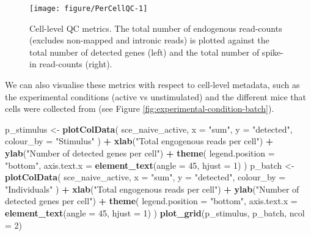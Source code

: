 \documentclass[9pt,a4paper,]{extarticle}
\newenvironment{Shaded}{\begin{snugshade}}{\end{snugshade}}
\newcommand{\DataTypeTok}[1]{\textcolor[rgb]{0.13,0.29,0.53}{#1}}
\newcommand{\DecValTok}[1]{\textcolor[rgb]{0.00,0.00,0.81}{#1}}
\newcommand{\KeywordTok}[1]{\textcolor[rgb]{0.13,0.29,0.53}{\textbf{#1}}}
\newcommand{\NormalTok}[1]{#1}
\newcommand{\OperatorTok}[1]{\textcolor[rgb]{0.81,0.36,0.00}{\textbf{#1}}}
\newcommand{\StringTok}[1]{\textcolor[rgb]{0.31,0.60,0.02}{#1}}
\begin{document}
\begin{figure}

{\centering \texttt{[image: figure/PerCellQC-1]} 

}

\caption{Cell-level QC metrics. The total number of endogenous read-counts (excludes non-mapped and intronic reads) is plotted against the total number of detected genes (left) and the total number of spike-in read-counts (right).}\label{fig:PerCellQC}
\end{figure}

We can also visualise these metrics with respect to cell-level metadata, such
as the experimental conditions (active vs unstimulated) and the different mice
that cells were collected from
(see Figure \ref{fig:experimental-condition-batch}).

\begin{Shaded}
\begin{Highlighting}[]
\NormalTok{p_stimulus <-}\StringTok{ }\KeywordTok{plotColData}\NormalTok{(}
\NormalTok{    sce_naive_active,}
    \DataTypeTok{x =} \StringTok{"sum"}\NormalTok{,}
    \DataTypeTok{y =} \StringTok{"detected"}\NormalTok{, }
    \DataTypeTok{colour_by =} \StringTok{"Stimulus"}
\NormalTok{  ) }\OperatorTok{+}
\StringTok{  }\KeywordTok{xlab}\NormalTok{(}\StringTok{"Total engogenous reads per cell"}\NormalTok{) }\OperatorTok{+}
\StringTok{  }\KeywordTok{ylab}\NormalTok{(}\StringTok{"Number of detected genes per cell"}\NormalTok{) }\OperatorTok{+}
\StringTok{  }\KeywordTok{theme}\NormalTok{(}
    \DataTypeTok{legend.position =} \StringTok{"bottom"}\NormalTok{,}
    \DataTypeTok{axis.text.x =} \KeywordTok{element_text}\NormalTok{(}\DataTypeTok{angle =} \DecValTok{45}\NormalTok{, }\DataTypeTok{hjust =} \DecValTok{1}\NormalTok{)}
\NormalTok{  )}
\NormalTok{p_batch <-}\StringTok{ }\KeywordTok{plotColData}\NormalTok{(}
\NormalTok{    sce_naive_active,}
    \DataTypeTok{x =} \StringTok{"sum"}\NormalTok{,}
    \DataTypeTok{y =} \StringTok{"detected"}\NormalTok{, }
    \DataTypeTok{colour_by =} \StringTok{"Individuals"}
\NormalTok{  ) }\OperatorTok{+}
\StringTok{  }\KeywordTok{xlab}\NormalTok{(}\StringTok{"Total engogenous reads per cell"}\NormalTok{) }\OperatorTok{+}
\StringTok{  }\KeywordTok{ylab}\NormalTok{(}\StringTok{"Number of detected genes per cell"}\NormalTok{) }\OperatorTok{+}
\StringTok{  }\KeywordTok{theme}\NormalTok{(}
    \DataTypeTok{legend.position =} \StringTok{"bottom"}\NormalTok{,}
    \DataTypeTok{axis.text.x =} \KeywordTok{element_text}\NormalTok{(}\DataTypeTok{angle =} \DecValTok{45}\NormalTok{, }\DataTypeTok{hjust =} \DecValTok{1}\NormalTok{)}
\NormalTok{  )}
\KeywordTok{plot_grid}\NormalTok{(p_stimulus, p_batch, }\DataTypeTok{ncol =} \DecValTok{2}\NormalTok{)}
\end{Highlighting}
\end{Shaded}
\end{document}
